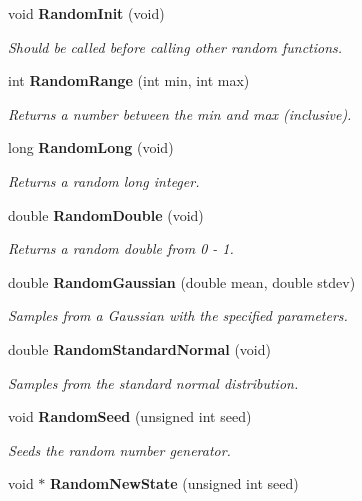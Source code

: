 \begin{CompactItemize}
\item 
void {\bf Random\-Init} (void)
\begin{CompactList}\small\item\em Should be called before calling other random functions. \item\end{CompactList}\item 
int {\bf Random\-Range} (int min, int max)
\begin{CompactList}\small\item\em Returns a number between the min and max (inclusive). \item\end{CompactList}\item 
long {\bf Random\-Long} (void)
\begin{CompactList}\small\item\em Returns a random long integer. \item\end{CompactList}\item 
double {\bf Random\-Double} (void)
\begin{CompactList}\small\item\em Returns a random double from 0 - 1. \item\end{CompactList}\item 
double {\bf Random\-Gaussian} (double mean, double stdev)
\begin{CompactList}\small\item\em Samples from a Gaussian with the specified parameters. \item\end{CompactList}\item 
double {\bf Random\-Standard\-Normal} (void)
\begin{CompactList}\small\item\em Samples from the standard normal distribution. \item\end{CompactList}\item 
void {\bf Random\-Seed} (unsigned int seed)
\begin{CompactList}\small\item\em Seeds the random number generator. \item\end{CompactList}\item 
void $\ast$ {\bf Random\-New\-State} (unsigned int seed)

\end{CompactItemize}

